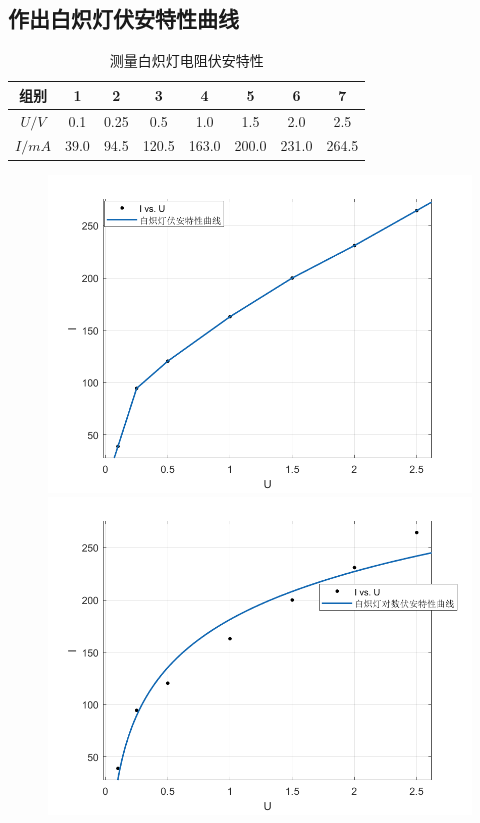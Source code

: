 \documentclass[UTF8]{ctexart}
\begin{document}
\subsection{作出白炽灯伏安特性曲线}
\begin{table}[H]
    \centering
    \caption{测量白炽灯电阻伏安特性}
    \begin{tabular}{|c|c|c|c|c|c|c|c|}
    \hline
      组别   & 1 & 2 & 3 & 4 & 5 & 6 & 7  \\
    \hline
       $U/V$  &  0.1  &  0.25  &  0.5  &  1.0  &  1.5  & 2.0  & 2.5          \\
    \hline
       $I/mA$ &  39.0  &   94.5  &   120.5   &   163.0  &   200.0  &   231.0  &  264.5   \\
    \hline
    \end{tabular}
\end{table}
\begin{figure}[H]  %
	\begin{minipage}[t]{0.5\linewidth}
		\centering
		\includegraphics[width = 1.0\textwidth]{img/白炽灯伏安特性曲线.png}
	\end{minipage}
	\qquad
	\begin{minipage}[t]{0.5\linewidth}
		\centering 
		\includegraphics[width = 1.0\textwidth]{img/白炽灯对数伏安特性曲线.png}
	\end{minipage}
 \end{figure}
\end{document}

